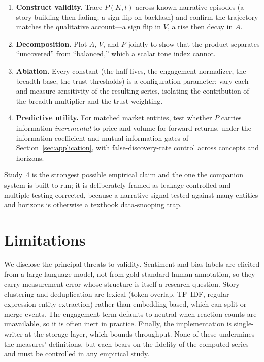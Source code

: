 \documentclass[11pt,a4paper]{article}
\theoremstyle{definition}
\begin{document}
\begin{enumerate}
  \item \textbf{Construct validity.} Trace $P(K,t)$ across known narrative episodes (a story building
        then fading; a sign flip on backlash) and confirm the trajectory matches the qualitative
        account---a sign flip in $V$, a rise then decay in $A$.
  \item \textbf{Decomposition.} Plot $A$, $V$, and $P$ jointly to show that the product separates
        ``uncovered'' from ``balanced,'' which a scalar tone index cannot.
  \item \textbf{Ablation.} Every constant (the half-lives, the engagement normalizer, the breadth
        base, the trust thresholds) is a configuration parameter; vary each and measure sensitivity of
        the resulting series, isolating the contribution of the breadth multiplier and the
        trust-weighting.
  \item \textbf{Predictive utility.} For matched market entities, test whether $\dot P$ carries
        information \emph{incremental} to price and volume for forward returns, under the
        information-coefficient and mutual-information gates of Section~\ref{sec:application}, with
        false-discovery-rate control across concepts and horizons.
\end{enumerate}

Study~4 is the strongest possible empirical claim and the one the companion system is built to run; it
is deliberately framed as leakage-controlled and multiple-testing-corrected, because a narrative
signal tested against many entities and horizons is otherwise a textbook data-snooping trap.

\section{Limitations}
\label{sec:limitations}

We disclose the principal threats to validity. Sentiment and bias labels are elicited from a large
language model, not from gold-standard human annotation, so they carry measurement error whose
structure is itself a research question. Story clustering and deduplication are lexical (token
overlap, TF--IDF, regular-expression entity extraction) rather than embedding-based, which can split
or merge events. The engagement term defaults to neutral when reaction counts are unavailable, so it
is often inert in practice. Finally, the implementation is single-writer at the storage layer, which
bounds throughput. None of these undermines the measures' definitions, but each bears on the fidelity
of the computed series and must be controlled in any empirical study.
\end{document}
